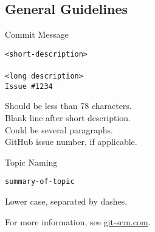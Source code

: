\documentclass[10pt]{article}
\newlength{\cvsep}
\newlength{\cvtitles}
\newlength{\cvmain}
\newenvironment{category}[1]
  {\parbox[t]{\cvtitles}{\large\sc\centering #1}\hspace*{\cvsep}\begin{minipage}[t]{\cvmain}}
  {\end{minipage}\vspace*{0.35cm}}
\begin{document}
\subsection*{General Guidelines}
\begin{category}{Commit Message}
\parbox[t]{0.6\cvmain}{%
  \texttt{<short-description>\\ \\ <long description>\\ Issue \#1234}
}
\parbox[t]{0.38\cvmain}{%
Should be less than 78 characters.\\
Blank line after short description.\\
Could be several paragraphs.\\
GitHub issue number, if applicable.
}
\end{category}
\begin{category}{Topic Naming}
\parbox[t]{0.6\cvmain}{%
  \texttt{summary-of-topic}
}
\parbox[t]{0.38\cvmain}{%
Lower case, separated by dashes.
}
\end{category}


\begin{center}
For more information, see \href{https://git-scm.com/}{git-scm.com}.
\end{center}
\end{document}
